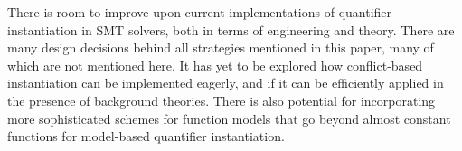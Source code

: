 \documentclass[oribibl]{llncs}
\begin{document}

There is room to improve upon current implementations of quantifier instantiation in SMT solvers,
both in terms of engineering and theory.
There are many design decisions behind all strategies mentioned in this paper, 
many of which are not mentioned here.
It has yet to be explored how conflict-based instantiation can be implemented eagerly,
and if it can be efficiently applied in the presence of background theories.
There is also potential for incorporating more sophisticated schemes for function models that go beyond almost constant functions
for model-based quantifier instantiation.
\end{document}
